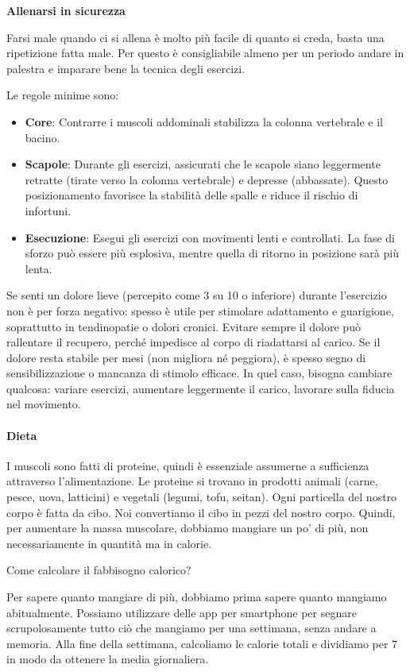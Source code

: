 \documentclass[12pt]{book} %
\begin{document}
\textbf{Allenarsi in sicurezza}

Farsi male quando ci si allena è molto più facile di quanto si creda, basta una ripetizione fatta male. Per questo è consigliabile almeno per un periodo andare in palestra e imparare bene la tecnica degli esercizi.

Le regole minime sono:
\begin{itemize}
\item \textbf{Core}: Contrarre i muscoli addominali stabilizza la colonna vertebrale e il bacino.
\item \textbf{Scapole}: Durante gli esercizi, assicurati che le scapole siano leggermente retratte (tirate verso la colonna vertebrale) e depresse (abbassate). Questo posizionamento favorisce la stabilità delle spalle e riduce il rischio di infortuni.
\item \textbf{Esecuzione}: Esegui gli esercizi con movimenti lenti e controllati. La fase di sforzo può essere più esplosiva, mentre quella di ritorno in posizione sarà più lenta.
\end{itemize}

Se senti un dolore lieve (percepito come 3 su 10 o inferiore) durante l’esercizio non è per forza negativo: spesso è utile per stimolare adattamento e guarigione, soprattutto in tendinopatie o dolori cronici.
Evitare sempre il dolore può rallentare il recupero, perché impedisce al corpo di riadattarsi al carico.
Se il dolore resta stabile per mesi (non migliora né peggiora), è spesso segno di sensibilizzazione o mancanza di stimolo efficace.
In quel caso, bisogna cambiare qualcosa: variare esercizi, aumentare leggermente il carico, lavorare sulla fiducia nel movimento.

\paragraph{Dieta}
I muscoli sono fatti di proteine, quindi è essenziale assumerne a sufficienza attraverso l'alimentazione. Le proteine si trovano in prodotti animali (carne, pesce, uova, latticini) e vegetali (legumi, tofu, seitan).
Ogni particella del nostro corpo è fatta da cibo. Noi convertiamo il cibo in pezzi del nostro corpo. Quindi, per aumentare la massa muscolare, dobbiamo mangiare un po' di più, non necessariamente in quantità ma in calorie.

Come calcolare il fabbisogno calorico?

Per sapere quanto mangiare di più, dobbiamo prima sapere quanto mangiamo abitualmente. Possiamo utilizzare delle app per smartphone per segnare scrupolosamente tutto ciò che mangiamo per una settimana, senza andare a memoria. Alla fine della settimana, calcoliamo le calorie totali e dividiamo per 7 in modo da ottenere la media giornaliera.
\end{document}
